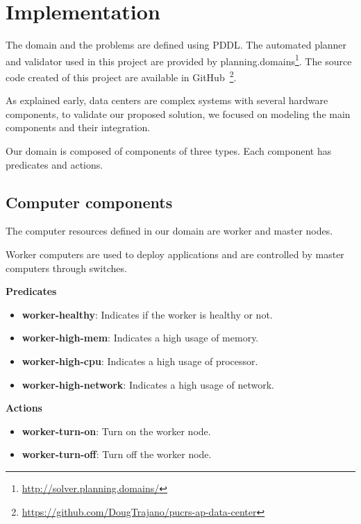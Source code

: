\documentclass[letterpaper]{article}
\begin{document}
\section{Implementation}\label{sec:implementation}

The domain and the problems are defined using PDDL. The automated planner and validator used in this project are provided by planning.domains\footnote{\url{http://solver.planning.domains/}}. The source code created of this project are available in GitHub~\footnote{\url{https://github.com/DougTrajano/pucrs-ap-data-center}}.

As explained early, data centers are complex systems with several hardware components, to validate our proposed solution, we focused on modeling the main components and their integration.

Our domain is composed of components of three types. Each component has predicates and actions.

\subsection{Computer components}\label{sec:implementation1}

The computer resources defined in our domain are worker and master nodes.

Worker computers are used to deploy applications and are controlled by master computers through switches.

\textbf{Predicates}

\begin{itemize}
    \item \textbf{worker-healthy}: Indicates if the worker is healthy or not.
    \item \textbf{worker-high-mem}: Indicates a high usage of memory.
    \item \textbf{worker-high-cpu}: Indicates a high usage of processor.
    \item \textbf{worker-high-network}: Indicates a high usage of network.
\end{itemize}

\textbf{Actions}

\begin{itemize}
    \item \textbf{worker-turn-on}: Turn on the worker node.
    \item \textbf{worker-turn-off}: Turn off the worker node.
\end{itemize}
\end{document}
